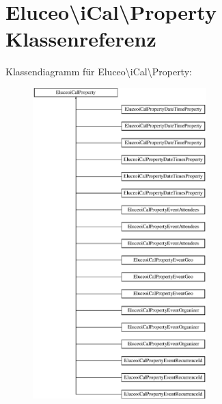 \hypertarget{class_eluceo_1_1i_cal_1_1_property}{}\section{Eluceo\textbackslash{}i\+Cal\textbackslash{}Property Klassenreferenz}
\label{class_eluceo_1_1i_cal_1_1_property}
Klassendiagramm für Eluceo\textbackslash{}i\+Cal\textbackslash{}Property\+:\begin{figure}[H]
\begin{center}
\leavevmode
\includegraphics[height=12.000000cm]{class_eluceo_1_1i_cal_1_1_property}
\end{center}
\end{figure}
